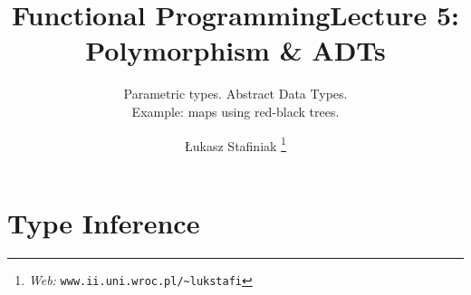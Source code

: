 \documentclass{beamer}
\newcommand{\tmfnhomepage}[1]{\thanks{\textit{Web:} \texttt{#1}}}
\begin{document}
\title{Functional Programming}

\author{
  {\L}ukasz Stafiniak
  \tmfnhomepage{www.ii.uni.wroc.pl/\~{}lukstafi}
}


\maketitle

\title{Lecture 5: Polymorphism \& ADTs}

\subtitle{Parametric types. Abstract Data Types.\\
Example: maps using red-black trees.}

\maketitle

{}

{\newpage}

\section{Type Inference}
\end{document}
